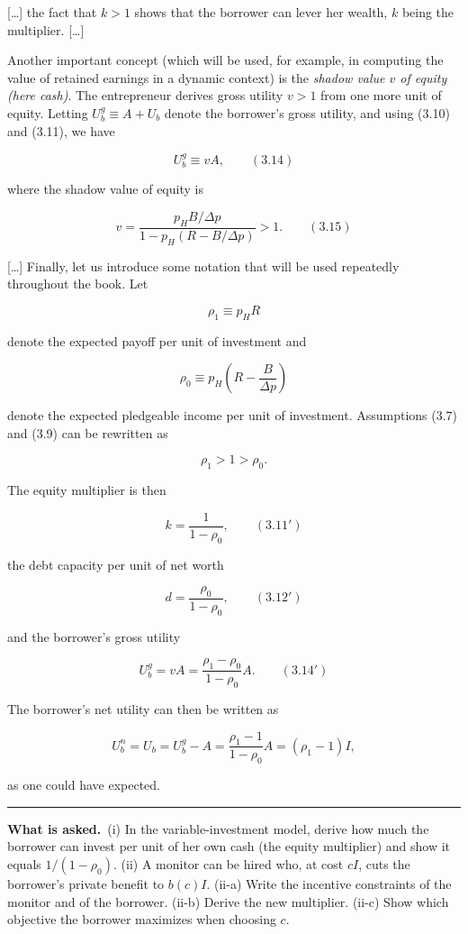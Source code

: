 \documentclass[11pt,a4paper]{article}
\newcommand{\asked}{\par\medskip\noindent\textbf{What is asked.}~}
\newcommand{\stmtend}{\par\endgroup\nopagebreak\noindent\rule{\linewidth}{0.4pt}\par\medskip}
\begin{document}
{[}\ldots{]} the fact that \(k > 1\) shows that the borrower can lever her wealth, \(k\) being the
multiplier. {[}\ldots{]}

Another important concept (which will be used, for example, in computing the value of retained
earnings in a dynamic context) is the \emph{shadow value \(v\) of equity (here cash)}. The
entrepreneur derives gross utility \(v > 1\) from one more unit of equity. Letting
\(U_b^g \equiv A + U_b\) denote the borrower's gross utility, and using (3.10) and (3.11), we have

\[U_b^g \equiv vA, \qquad (3.14)\]

where the shadow value of equity is

\[v = \frac{p_H B/\Delta p}{1 - p_H(R - B/\Delta p)} > 1. \qquad (3.15)\]

{[}\ldots{]} Finally, let us introduce some notation that will be used repeatedly throughout the
book. Let

\[\rho_1 \equiv p_H R\]

denote the expected payoff per unit of investment and

\[\rho_0 \equiv p_H\left(R - \frac{B}{\Delta p}\right)\]

denote the expected pledgeable income per unit of investment. Assumptions (3.7) and (3.9) can be
rewritten as

\[\rho_1 > 1 > \rho_0.\]

The equity multiplier is then

\[k = \frac{1}{1 - \rho_0}, \qquad (3.11')\]

the debt capacity per unit of net worth

\[d = \frac{\rho_0}{1 - \rho_0}, \qquad (3.12')\]

and the borrower's gross utility

\[U_b^g = vA = \frac{\rho_1 - \rho_0}{1 - \rho_0} A. \qquad (3.14')\]

The borrower's net utility can then be written as

\[U_b^n = U_b = U_b^g - A = \frac{\rho_1 - 1}{1 - \rho_0} A = (\rho_1 - 1) I,\]

as one could have expected.
\stmtend

\asked (i) In the variable-investment model, derive how much the borrower can invest per unit
of her own cash (the equity multiplier) and show it equals $1/(1-\rho_0)$. (ii) A monitor can be
hired who, at cost $cI$, cuts the borrower's private benefit to $b(c)I$. (ii-a) Write the
incentive constraints of the monitor and of the borrower. (ii-b) Derive the new multiplier.
(ii-c) Show which objective the borrower maximizes when choosing $c$.
\end{document}
